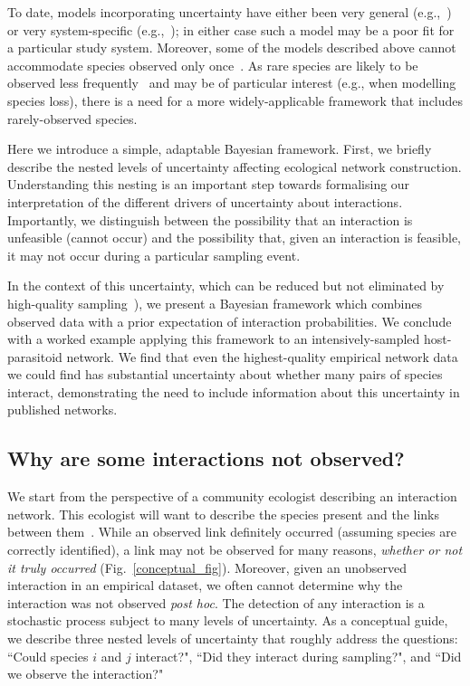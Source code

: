 \documentclass[12pt]{article}
\begin{document}
\begin{spacing}{1.5}
    To date, models incorporating uncertainty have either been very general (e.g.,~\citet{Guimera2009,Gravel2018}) or very system-specific (e.g.,~\citet{Bartomeus2013,Graham2018}); in either case such a model may be a poor fit for a particular study system. Moreover, some of the models described above cannot accommodate species observed only once~\citep{Bartomeus2013,Weinstein2017}. As rare species are likely to be observed less frequently~\citep{Bluthgen2006} and may be of particular interest (e.g., when modelling species loss), there is a need for a more widely-applicable framework that includes rarely-observed species. 


    Here we introduce a simple, adaptable Bayesian framework. First, we briefly describe the nested levels of uncertainty affecting ecological network construction. Understanding this nesting is an important step towards formalising our interpretation of the different drivers of uncertainty about interactions. Importantly, we distinguish between the possibility that an interaction is unfeasible (cannot occur) and the possibility that, given an interaction is feasible, it may not occur during a particular sampling event. 


    In the context of this uncertainty, which can be reduced but not eliminated by high-quality sampling~\citep{Bartomeus2013}), we present a Bayesian framework which combines observed data with a prior expectation of interaction probabilities. We conclude with a worked example applying this framework to an intensively-sampled host-parasitoid network. We find that even the highest-quality empirical network data we could find has substantial uncertainty about whether many pairs of species interact, demonstrating the need to include information about this uncertainty in published networks. 


    \subsection*{Why are some interactions not observed?}

      We start from the perspective of a community ecologist describing an interaction network. This ecologist will want to describe the species present and the links between them~\citep{Roslin2016}. While an observed link definitely occurred (assuming species are correctly identified), a link may not be observed for many reasons, \emph{whether or not it truly occurred} (Fig.~\ref{conceptual_fig}). Moreover, given an unobserved interaction in an empirical dataset, we often cannot determine why the interaction was not observed \emph{post hoc}. The detection of any interaction is a stochastic process subject to many levels of uncertainty. As a conceptual guide, we describe three nested levels of uncertainty that roughly address the questions: ``Could species $i$ and $j$ interact?", ``Did they interact during sampling?", and ``Did we observe the interaction?"



\end{spacing}
\end{document}
